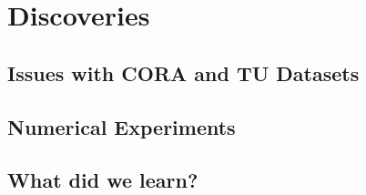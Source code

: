 \documentclass{beamer}
\begin{document}
\section{Discoveries}
\subsection{Issues with CORA and TU Datasets}
\subsection{Numerical Experiments}
\subsection{What did we learn?}
\end{document}
